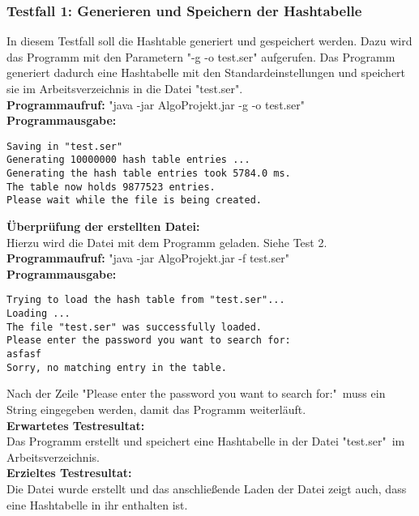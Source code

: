 \documentclass[11pt]{article}
\begin{document}
  \subsubsection{Testfall 1: Generieren und Speichern der Hashtabelle}
    In diesem Testfall soll die Hashtable generiert und gespeichert werden. Dazu wird das Programm mit den Parametern "-g -o test.ser" aufgerufen. Das Programm generiert dadurch eine Hashtabelle mit den Standardeinstellungen und speichert sie im Arbeitsverzeichnis in die Datei "test.ser".\\
    \textbf{Programmaufruf:} "java -jar AlgoProjekt.jar -g -o test.ser"\\
    \textbf{Programmausgabe:}
    \begin{verbatim}
Saving in "test.ser"
Generating 10000000 hash table entries ...
Generating the hash table entries took 5784.0 ms.
The table now holds 9877523 entries.
Please wait while the file is being created.
    \end{verbatim}
    \textbf{Überprüfung der erstellten Datei:}\\
    Hierzu wird die Datei mit dem Programm geladen. Siehe Test 2.\\
    \textbf{Programmaufruf:}
    "java -jar AlgoProjekt.jar -f test.ser"\\
         \textbf{Programmausgabe:}
         \begin{verbatim}
Trying to load the hash table from "test.ser"...
Loading ...
The file "test.ser" was successfully loaded.
Please enter the password you want to search for: 
asfasf
Sorry, no matching entry in the table.
         \end{verbatim}
         Nach der Zeile "Please enter the password you want to search for:"\
         muss ein String eingegeben werden, damit das Programm weiterläuft.\\
         \textbf{Erwartetes Testresultat:}\\
Das Programm erstellt und speichert eine Hashtabelle in der Datei "test.ser"\ im Arbeitsverzeichnis.\\
\textbf{Erzieltes Testresultat:}\\
Die Datei wurde erstellt und das anschließende Laden der Datei zeigt auch, dass eine Hashtabelle in ihr enthalten ist.
\end{document}
